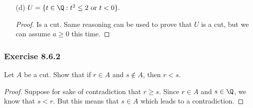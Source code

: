\begin{enumerate}
\begin{proof}[Solution]
        Next, we show (C2). Let \( r \in T  \). Then by definition of \( T  \), we must have either \( r^{2} < 2  \) or \( r < 0  \). If \( r < 0  \), then we can easily pick \(  q < r  \) for any \( q < 0  \). Otherwise, we have \( r^{2} < 2  \) such that if we let \( q \in \Q  \) be arbitrary with \( q^{2} < r^{2}  \). Then we easily have \( q < r  \).

        Finally, we show (C3). Let \( r \in T  \). Then either we have \( r^{2} < 2  \) or \( r < 0  \). Consider 
        \begin{align*}
           \Big( r + \frac{ 1 }{ n }  \Big)^{2} &= r^{2} + \frac{ 2r }{ n }  + \frac{ 1 }{ n }  \\
                                                &= r^{2} +  \frac{ 2r + 1  }{ n  }.  \\
        \end{align*}
        Let us set \( s = r + \frac{ 1 }{ n_{0} }   \). If \( r > 0  \), then we can pick an \( n_{0}  \) large enough such that 
        \[ \frac{ 1 }{ n_{0}  }  < \frac{ 4 - r^{2}  }{ 2r+1  }.   \]
        Then we have 
        \[  \Big( r + \frac{ 1 }{ n_{0} }  \Big)^{2} < r^{2} + \frac{ 2r+1 }{ n_{0} } < r^{2} + \frac{ 2r+1 }{ n_{0}  }  \cdot \frac{ 4 - r^{2} }{ 2r+1 } < 4. \]
        Hence, we have \( r < s < 2   \). Otherwise, we choose \( n_{0 }  \) large enough so that 
        \[  \frac{ 1 }{ n_{0}  }  < \frac{ -r^{2} }{  2r+1 }. \] Then we have 
        \[  \Big( r + \frac{ 1 }{ n_{0} }  \Big)^{2} < r^{2} + \frac{ 2r+1 }{ n_{0} }  < 0. \]
         This implies that \( r < s < 0  \). 
     \end{proof}


    \item[(d)] \( U = \{ t \in \Q : t^{2} \leq 2 \ \text{or} \ t < 0  \}.  \)
            \begin{proof}
            Is a cut. Same reasoning can be used to prove that \( U  \) is a cut, but we can assume \( a \geq 0  \) this time.
            \end{proof}
\end{enumerate}

\subsubsection{Exercise 8.6.2} 
Let \( A  \) be a cut. Show that if \( r \in  A \) and \( s \notin A  \), then \( r < s  \).
\begin{proof}
Suppose for sake of contradiction that \( r \geq s  \). Since \( r \in A  \) and \( s \in \Q  \), we know that \( s < r   \). But this means that \( s \in A  \) which leads to a contradiction.
\end{proof}

